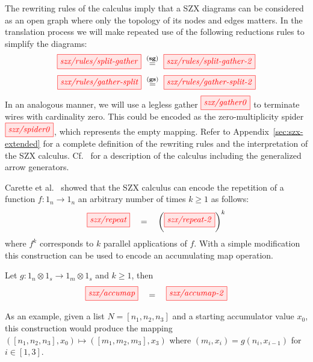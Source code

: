 The rewriting rules of the calculus imply that a SZX diagrams can be considered
as an open graph where only the topology of its nodes and edges matters.
%
In the translation process we will make repeated use of the following
reductions rules to simplify the diagrams:
\[
    \tikzfig{szx/rules/split-gather}
    \ \stackrel{\mathbf{(sg)}}{=}\ %
    \tikzfig{szx/rules/split-gather-2}
\]
\[
    \tikzfig{szx/rules/gather-split}
    \ \stackrel{\mathbf{(gs)}}{=}\ %
    \tikzfig{szx/rules/gather-split-2}
\]
In an analogous manner, we will use a legless gather $\tikzfig{szx/gather0}$ to terminate wires with cardinality zero.
This could be encoded as the zero-multiplicity spider $\tikzfig{szx/spider0}$, which represents the empty mapping. Refer to Appendix~\ref{sec:szx-extended} for a complete definition
of the rewriting rules and the interpretation of the SZX calculus.
%
Cf.~\cite{carette_quantum_2021} for a description of the calculus including the generalized arrow generators.

Carette et al.~\cite{carette_quantum_2021} showed that the SZX calculus
can encode the repetition of a function $f : 1_n \to 1_n$ an arbitrary number of times $k\geq 1$ as follows:
\[
    \tikzfig{szx/repeat}
    \quad=\quad%
    \left(\tikzfig{szx/repeat-2}\right)^k
\]
where $f^k$ corresponds to $k$ parallel applications of $f$.
With a simple modification this construction can be used to encode an accumulating map operation.
\begin{lemma}%
    \label{lem:accumap}
    Let $g : 1_n \otimes 1_s \to 1_{m} \otimes 1_s$ and $k\geq 1$, then
    \[
    \tikzfig{szx/accumap}
    \quad=\quad%
    \tikzfig{szx/accumap-2}
    \]
\end{lemma}
As an example, given a list $N = [n_1, n_2, n_3]$ and a starting accumulator value $x_0$,
this construction would produce the mapping $([n_1, n_2, n_3], x_0) \mapsto ([m_1, m_2, m_3], x_3)$ where
$(m_i, x_i) = g(n_i, x_{i-1})$ for $i \in [1,3]$.
